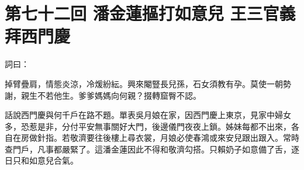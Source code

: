 
\chapter*{第七十二回 潘金蓮摳打如意兒 王三官義拜西門慶}


詞曰：

\begin{myquote}
掉臂疊肩，情態炎涼，冷煖紛紜。興來閹豎長兒孫，石女須教有孕。莫使一朝勢謝，親生不若他生。爹爹媽媽向何親？掇轉窟臀不認。

\end{myquote}

話說西門慶與何千戶在路不題。單表吳月娘在家，因西門慶上東京，見家中婦女多，恐惹是非，分付平安無事關好大門，後邊儀門夜夜上鎖。姊妹每都不出來，各自在房做針指。若敬濟要往後樓上尋衣裳，月娘必使春鴻或來安兒跟出跟入。常時查門戶，凡事都嚴緊了。這潘金蓮因此不得和敬濟勾搭。只賴奶子如意備了舌，逐日只和如意兒合氣。

